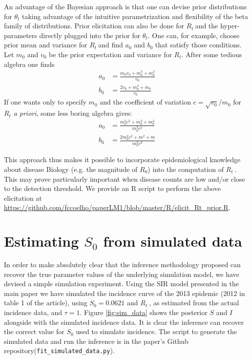 \documentclass[a4paper,10pt]{article}
\def \rr {$R_{t}\:$}
\begin{document}
An advantage of the Bayesian approach is that one can devise prior 
distributions for $\theta_t$ taking advantage of the intuitive parametrization 
and flexibility of the beta family of distributions.
Prior elicitation can also be done for \rr and the hyper-parameters directly 
plugged into the prior for $\theta_t$. 
One can, for example, choose prior mean and variance for \rr and find $a_0$ 
and $b_0$ that satisfy those conditions.
Let $m_0$ and $v_0$ be the prior expectation and variance for $R_t$. 
After some tedious algebra one finds
\begin{align}
\label{seq:elicitation}
a_0 &= \frac{m_0v_0 + m_0^3 + m_0^2}{v_0} \\
b_0 &= \frac{2v_0 + m_0^2 + m_0}{v_0}
\end{align}
If one wants only to specify $m_0$ and the coefficient of variation $c = 
\sqrt{v_0}/ m_0$ for $R_t$ \textit{a priori}, some less boring 
algebra gives:
\begin{align}
\label{seq:elicitationcv}
a_0 &= \frac{m_0^3c^2 + m_0^3 + m_0^2}{m_0^2c^2} \\
b_0 &= \frac{2m_0^2c^2 + m^2 + m}{m_0^2c^2}
\end{align}

This approach thus makes it possible to incorporate epidemiological knowledge 
about disease Biology (e.g. the magnitude of $R_0$) into the computation of \rr.
This may prove particularly important when disease counts are low and/or close 
to the detection threshold.
We provide an R script to perform the above elicitation at 
\url{https://github.com/fccoelho/paperLM1/blob/master/R/elicit_Rt_prior.R}.

\section*{Estimating $S_0$ from simulated data}
In order to make absolutely clear that the inference methodology proposed can 
recover the true parameter values of the underlying simulation model, we have 
devised a simple simulation experiment. Using the SIR model presented in the 
main paper we have simulated the incidence curve of the  2013 epidemic (2012 in 
table 1 of the article), using $S_0 = 0.0621$ and \rr, as estimated from the 
actual incidence data, and $\tau=1$. Figure \ref{fig:sim_data} shows the 
posterior $S$ and $I$ alongside with the simulated incidence data. It is clear 
the inference can recover the correct value for $S_0$ used to   simulate 
incidence. The script to generate the simulated data and run the inference is in 
the paper's Github repository(\verb|fit_simulated_data.py|).
\end{document}
